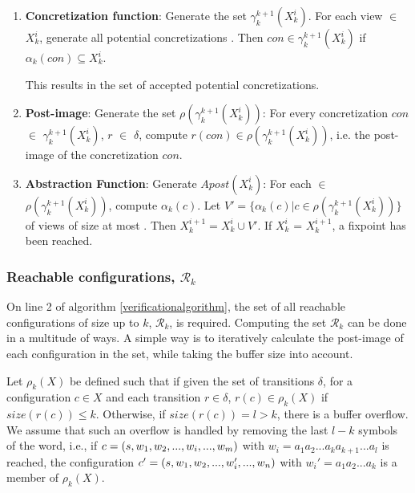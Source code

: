 \begin{enumerate}
\item
\textbf{Concretization function}:
Generate the set $\gamma_k^{k+1}(X_k^i)$. For each view  $\in$ $X_k^i$, generate all potential concretizations . Then $con \in \gamma_k^{k+1}(X_k^i)$ if $\alpha_k(con) \subseteq X_k^i$.

This results in the set of accepted potential concretizations.

\item
\textbf{Post-image}:
Generate the set $\rho(\gamma_k^{k+1}(X_k^i))$: For every concretization $con$ $\in$ $\gamma_k^{k+1}(X_k^i)$, $r$ $\in$ $\delta$, compute $r(con) \in \rho(\gamma_k^{k+1}(X_k^i))$, i.e. the post-image of the concretization $con$.

\item
\textbf{Abstraction Function}:
Generate $Apost(X_k^i)$: For each  $\in$ $\rho(\gamma_k^{k+1}(X_k^i))$, compute $\alpha_k(c)$. Let $V' = \{\alpha_k(c)|c \in \rho(\gamma_k^{k+1}(X_k^i))\}$ of views of size at most . Then $X_k^{i+1} = X_k^i \cup V'$. If $X_k^i$ = $X_k^{i+1}$, a fixpoint has been reached.

\end{enumerate}

\subsubsection{Reachable configurations, $\mathcal{R}_k$}
\label{part2}
On line 2 of algorithm \ref{verificationalgorithm}, the set of all reachable configurations of size up to $k$, $\mathcal{R}_k$, is required. Computing the set $\mathcal{R}_k$ can be done in a multitude of ways. A simple way is to iteratively calculate the post-image of each configuration in the set, while taking the buffer size into account.

Let $\rho_k(X)$ be defined such that if given the set of transitions $\delta$, for a configuration $c \in X$ and each transition $r \in \delta$, $r(c) \in \rho_k(X)$ if $size(r(c)) \leq k$. Otherwise, if $size(r(c)) = l > k$, there is a buffer overflow. We assume that such an overflow is handled by removing the last $l-k$ symbols of the word, i.e., if $c = (s, w_1, w_2,..., w_i, ...,  w_m)$ with $w_i = a_1a_2...a_ka_{k+1}...a_l$ is reached, the configuration $c' = (s, w_1, w_2, ..., w_i', ..., w_n)$ with $w_i' = a_1a_2...a_k$ is a member of $\rho_k(X)$.

